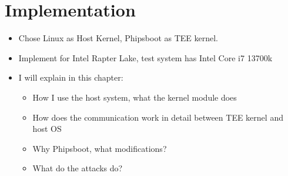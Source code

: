 \chapter{Implementation}
\label{sec:implementation}


\begin{itemize}
    \item Chose Linux as Host Kernel, Phipsboot as TEE kernel.
    \item Implement for Intel Rapter Lake, test system has Intel Core i7 13700k
    \item I will explain in this chapter:
          \begin{itemize}
              \item How I use the host system, what the kernel module does
              \item How does the communication work in detail between TEE kernel and host OS
              \item Why Phipsboot, what modifications?
              \item What do the attacks do?
          \end{itemize}
\end{itemize}

